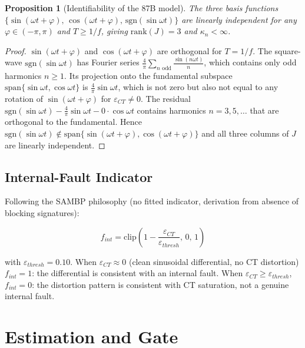 \documentclass[12pt,a4paper]{article}
\newtheorem{proposition}[theorem]{Proposition}
\newcommand{\kappan}{\kappa_n}
\begin{document}
\begin{proposition}[Identifiability of the 87B model]
\label{prop:87B_id}
The three basis functions $\{\sin(\omega t + \varphi),\,
\cos(\omega t + \varphi),\, \mathrm{sgn}(\sin\omega t)\}$ are linearly
independent for any $\varphi \in (-\pi, \pi)$ and $T \geq 1/f$, giving
$\mathrm{rank}(J) = 3$ and $\kappan < \infty$.
\end{proposition}

\begin{proof}
$\sin(\omega t + \varphi)$ and $\cos(\omega t + \varphi)$ are orthogonal for
$T = 1/f$.  The square-wave $\mathrm{sgn}(\sin\omega t)$ has Fourier series
$\frac{4}{\pi}\sum_{n \text{ odd}} \frac{\sin(n\omega t)}{n}$, which contains
only odd harmonics $n \geq 1$.  Its projection onto the fundamental subspace
$\mathrm{span}\{\sin\omega t, \cos\omega t\}$ is $\frac{4}{\pi}\sin\omega t$,
which is not zero but also not equal to any rotation of $\sin(\omega t + \varphi)$
for $\varepsilon_{CT} \neq 0$.  The residual
$\mathrm{sgn}(\sin\omega t) - \frac{4}{\pi}\sin\omega t - 0 \cdot \cos\omega t$
contains harmonics $n = 3, 5, \ldots$ that are orthogonal to the fundamental.
Hence $\mathrm{sgn}(\sin\omega t) \notin \mathrm{span}\{\sin(\omega t+\varphi),
\cos(\omega t + \varphi)\}$ and all three columns of $J$ are linearly independent.
\end{proof}

\subsection{Internal-Fault Indicator}
\label{sec:f_int}

Following the SAMBP philosophy (no fitted indicator, derivation from absence
of blocking signatures):

\begin{equation}
  f_{int} = \mathrm{clip}\!\left(1 - \frac{\varepsilon_{CT}}{\varepsilon_{thresh}},\, 0,\, 1\right)
  \label{eq:f_int_B}
\end{equation}

with $\varepsilon_{thresh} = 0.10$.  When $\varepsilon_{CT} \approx 0$ (clean
sinusoidal differential, no CT distortion) $f_{int} = 1$: the differential is
consistent with an internal fault.  When $\varepsilon_{CT} \geq \varepsilon_{thresh}$,
$f_{int} = 0$: the distortion pattern is consistent with CT saturation, not a
genuine internal fault.

\section{Estimation and Gate}
\label{sec:estimation}
\end{document}
